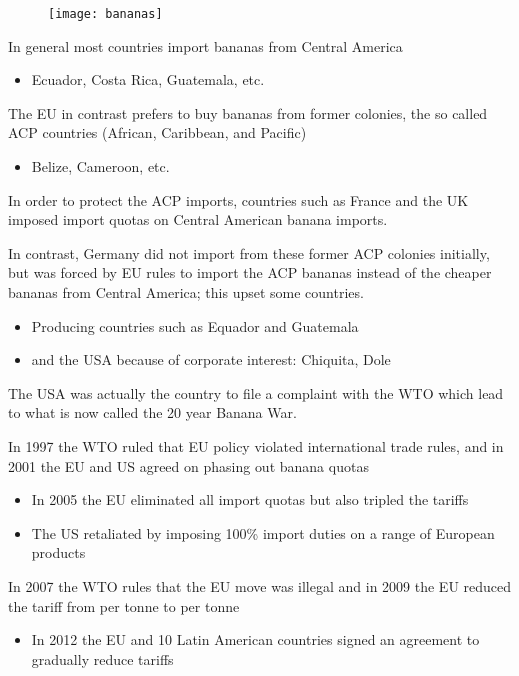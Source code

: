 \documentclass{beamer}
\begin{document}
\begin{frame}
  \begin{figure}
    \texttt{[image: bananas]}
  \end{figure}
\end{frame}

\begin{frame}
  In general most countries import bananas from Central America
  \begin{itemize}
    \item Ecuador, Costa Rica, Guatemala, etc.
  \end{itemize}
  \medskip
  The EU in contrast prefers to buy bananas from former colonies, the so called ACP countries (African, Caribbean, and Pacific)
  \begin{itemize}
    \item Belize, Cameroon, etc.
  \end{itemize}
  \medskip
  In order to protect the ACP imports, countries such as France and the UK imposed import quotas on Central American banana imports.  
\end{frame}

\begin{frame}
  In contrast, Germany did not import from these former ACP colonies initially, but was forced by EU rules to import the ACP bananas instead of the cheaper bananas from Central America; this upset some countries.
  \begin{itemize}
    \item Producing countries such as Equador and Guatemala
    \item and the USA because of corporate interest: Chiquita, Dole 
  \end{itemize}
  \medskip
  The USA was actually the country to file a complaint with the WTO which lead to what is now called the 20 year Banana War. 
\end{frame}

\begin{frame}
  In 1997 the WTO ruled that EU policy violated international trade rules, and in 2001 the EU and US agreed on phasing out banana quotas
  \begin{itemize}
    \item In 2005 the EU eliminated all import quotas but also tripled the tariffs
    \item The US retaliated by imposing 100\% import duties on a range of European products
  \end{itemize}
  \medskip
  In 2007 the WTO rules that the EU move was illegal and in 2009 the EU reduced the tariff from  per tonne to  per tonne
  \begin{itemize}
    \item In 2012 the EU and 10 Latin American countries signed an agreement to gradually reduce tariffs
  \end{itemize}
\end{frame}
\end{document}
